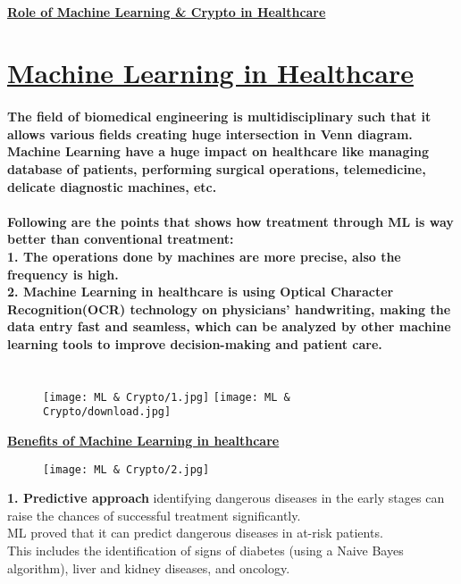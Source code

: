 \documentclass{article}
\begin{document}
	\paragraph{\Large \textbf{\centering \underline{Role of Machine Learning \& Crypto in Healthcare}}}
	\section{\Large \textbf{\underline{Machine Learning in Healthcare}}}
	\paragraph{The field of biomedical engineering is multidisciplinary such that it allows various fields creating huge intersection in Venn diagram. Machine Learning have a huge impact on healthcare like managing database of patients, performing surgical operations, telemedicine, delicate diagnostic machines, etc.\\\\
	Following are the points that shows how treatment through ML is way better than conventional treatment:\\
	1.	The operations done by machines are more precise, also the frequency is high.\\
    2.	Machine Learning in healthcare is using Optical Character Recognition(OCR) technology on physicians’ handwriting, making the data entry fast and seamless, which can be analyzed by other machine learning tools to improve decision-making and patient care.\\\\}
    \begin{figure}[h]
    	\texttt{[image: ML \& Crypto/1.jpg]}
    	\texttt{[image: ML \& Crypto/download.jpg]}
    \end{figure}
    
    \textbf{\underline{Benefits of Machine Learning in healthcare}}\\
    \begin{figure}[h]
        \centering
    	\texttt{[image: ML \& Crypto/2.jpg]}
    \end{figure}
    
    \textbf{1. Predictive approach }identifying dangerous diseases in the early stages can raise the chances of successful treatment significantly.\\
    ML proved that it can predict dangerous diseases in at-risk patients. \\
    This includes the identification of signs of diabetes (using a Naive Bayes algorithm), liver and kidney diseases, and oncology.
    
\end{document}
